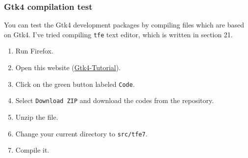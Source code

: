 \hypertarget{gtk4-compilation-test}{%
\subsubsection{Gtk4 compilation test}\label{gtk4-compilation-test}}

You can test the Gtk4 development packages by compiling files which are
based on Gtk4. I've tried compiling \passthrough{\lstinline!tfe!} text
editor, which is written in section 21.

\begin{enumerate}
\def\labelenumi{\arabic{enumi}.}
\tightlist
\item
  Run Firefox.
\item
  Open this website
  (\href{https://github.com/ToshioCP/Gtk4-tutorial}{Gtk4-Tutorial}).
\item
  Click on the green button labeled \passthrough{\lstinline!Code!}.
\item
  Select \passthrough{\lstinline!Download ZIP!} and download the codes
  from the repository.
\item
  Unzip the file.
\item
  Change your current directory to \passthrough{\lstinline!src/tfe7!}.
\item
  Compile it.
\end{enumerate}

